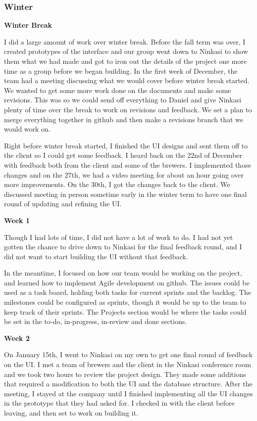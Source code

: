 \subsubsection{Winter}
\hfill\break
\textbf{Winter Break}

I did a large amount of work over winter break.
Before the fall term was over, I created prototypes of the interface and our group went down to Ninkasi to show them what we had made and got to iron out the details of the project one more time as a group before we began building.
In the first week of December, the team had a meeting discussing what we would cover before winter break started.
We wanted to get some more work done on the documents and make some revisions.
This was so we could send off everything to Daniel and give Ninkasi plenty of time over the break to work on revisions and feedback.
We set a plan to merge everything together in github and then make a revisions branch that we would work on.

Right before winter break started, I finished the UI designs and sent them off to the client so I could get some feedback.
I heard back on the 22nd of December with feedback both from the client and some of the brewers.
I implemented those changes and on the 27th, we had a video meeting for about an hour going over more improvements.
On the 30th, I got the changes back to the client.
We discussed meeting in person sometime early in the winter term to have one final round of updating and refining the UI.

\noindent\medskip\textbf{Week 1}

Though I had lots of time, I did not have a lot of work to do.
I had not yet gotten the chance to drive down to Ninkasi for the final feedback round, and I did not want to start building the UI without that feedback.

In the meantime, I focused on how our team would be working on the project, and learned how to implement Agile development on github.
The issues could be used as a task board, holding both tasks for current sprints and the backlog.
The milestones could be configured as sprints, though it would be up to the team to keep track of their sprints.
The Projects section would be where the tasks could be set in the to-do, in-progress, in-review and done sections.

\noindent\medskip\textbf{Week 2}

On January 15th, I went to Ninkasi on my own to get one final round of feedback on the UI.
I met a team of brewers and the client in the Ninkasi conference room and we took two hours to review the project design.
They made some additions that required a modification to both the UI and the database structure.
After the meeting, I stayed at the company until I finished implementing all the UI changes in the prototype that they had asked for.
I checked in with the client before leaving, and then set to work on building it.

